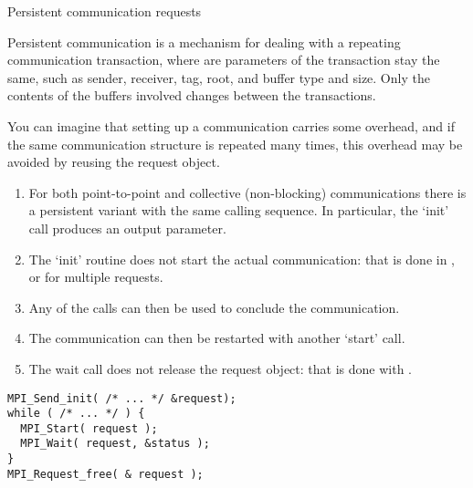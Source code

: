 
 {Persistent communication requests}
\label{sec:persistent}

Persistent communication is a mechanism for dealing
with a repeating communication transaction,
where are parameters of the transaction
stay the same, such as sender, receiver, tag, root, and buffer type and size.
Only the contents of the buffers involved changes between the transactions.

You can imagine that setting up a communication
carries some overhead, and if the same communication structure
is repeated many times, this overhead may be avoided by reusing
the request object.

\begin{enumerate}
\item
  For both point-to-point and collective (non-blocking) communications
  there is a persistent variant 
  with the same calling sequence.
  In particular, the `init' call produces
  an  output parameter.
\item 
  The `init' routine does not start the actual communication:
  that is done in
  ,
  or  for multiple requests.
\item Any of the  calls can then be used
  to conclude the communication.
\item The communication can then be restarted with another `start' call.
\item The wait call does not release the request object: that is done
  with .
\end{enumerate}

\begin{lstlisting}
MPI_Send_init( /* ... */ &request);
while ( /* ... */ ) {
  MPI_Start( request );
  MPI_Wait( request, &status );
}
MPI_Request_free( & request );
\end{lstlisting}

